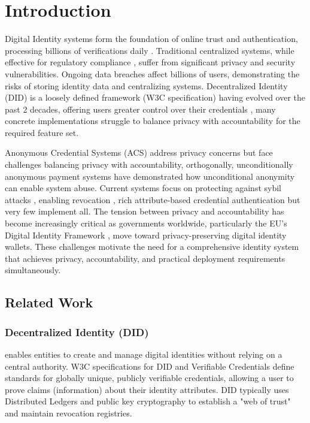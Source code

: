 \section{Introduction}
Digital Identity systems form the foundation of online trust and authentication, processing billions of verifications daily \cite{noauthor_happy_2021, pang_zanzibar_nodate}. Traditional centralized systems, while effective for regulatory compliance \cite{eltayeb_crucial_2024}, suffer from significant privacy and security vulnerabilities. Ongoing data breaches \cite{zhang_data_2022} affect billions of users, demonstrating the risks of storing identity data and centralizing systems. Decentralized Identity (DID) is a loosely defined framework (W3C specification) having evolved over the past 2 decades, offering users greater control over their credentials \cite{soltani_survey_2021}, many concrete implementations struggle to balance privacy with accountability \cite{maram2021candid} for the required feature set. 


\noindent Anonymous Credential Systems (ACS) \cite{chaum1985security,hutchison_signature_2004, hutchison_constant-size_2006, sako_short_2016, fuchsbauer_structure-preserving_2019} address privacy concerns but face challenges balancing privacy with accountability, orthogonally, unconditionally anonymous payment systems have demonstrated how unconditional anonymity can enable system abuse. Current systems focus on protecting against sybil attacks \cite{crites_syra_2024, rabaninejad_attribute-based_nodate}, enabling revocation \cite{goos_dynamic_2002, robshaw_uc_2016, camenisch_scalable_2016, baldimtsi_accumulators_2017}, rich attribute-based credential authentication \cite{rosenberg_zk-creds_2022, babel_bringing_2023} but very few implement all. The tension between privacy and accountability has become increasingly critical as governments worldwide, particularly the EU's Digital Identity Framework \cite{noauthor_regulation_2024}, move toward privacy-preserving digital identity wallets. These challenges motivate the need for a comprehensive identity system that achieves privacy, accountability, and practical deployment requirements simultaneously.

\subsection{Related Work}

\subsubsection{Decentralized Identity (DID)}
enables entities to create and manage digital identities without relying on a central authority. W3C specifications for DID and Verifiable Credentials define standards for globally unique, publicly verifiable credentials, allowing a user to prove claims (information) about their identity attributes. DID typically uses Distributed Ledgers and public key cryptography to establish a "web of trust" and maintain revocation registries. 

